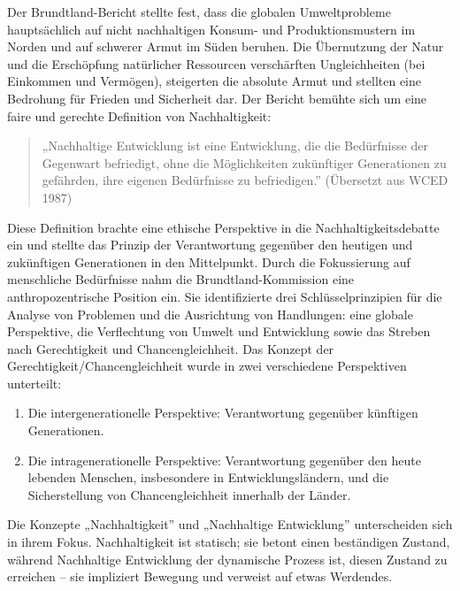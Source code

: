 \documentclass[
  nswissgerman,
  a4paper,
  DIV=11,
  numbers=noendperiod,
  oneside,
  openany]{scrreprt}
\providecommand{\tightlist}{%
  \setlength{\itemsep}{0pt}\setlength{\parskip}{0pt}}
\begin{document}
Der Brundtland-Bericht stellte fest, dass die globalen Umweltprobleme
hauptsächlich auf nicht nachhaltigen Konsum- und Produktionsmustern im
Norden und auf schwerer Armut im Süden beruhen. Die Übernutzung der
Natur und die Erschöpfung natürlicher Ressourcen verschärften
Ungleichheiten (bei Einkommen und Vermögen), steigerten die absolute
Armut und stellten eine Bedrohung für Frieden und Sicherheit dar. Der
Bericht bemühte sich um eine faire und gerechte Definition von
Nachhaltigkeit:

\begin{quote}
„Nachhaltige Entwicklung ist eine Entwicklung, die die Bedürfnisse der
Gegenwart befriedigt, ohne die Möglichkeiten zukünftiger Generationen zu
gefährden, ihre eigenen Bedürfnisse zu befriedigen.'' (Übersetzt aus
WCED 1987)
\end{quote}

Diese Definition brachte eine ethische Perspektive in die
Nachhaltigkeitsdebatte ein und stellte das Prinzip der Verantwortung
gegenüber den heutigen und zukünftigen Generationen in den Mittelpunkt.
Durch die Fokussierung auf menschliche Bedürfnisse nahm die
Brundtland-Kommission eine anthropozentrische Position ein. Sie
identifizierte drei Schlüsselprinzipien für die Analyse von Problemen
und die Ausrichtung von Handlungen: eine globale Perspektive, die
Verflechtung von Umwelt und Entwicklung sowie das Streben nach
Gerechtigkeit und Chancengleichheit. Das Konzept der
Gerechtigkeit/Chancengleichheit wurde in zwei verschiedene Perspektiven
unterteilt:

\begin{enumerate}
\def\labelenumi{\arabic{enumi}.}
\tightlist
\item
  Die intergenerationelle Perspektive: Verantwortung gegenüber künftigen
  Generationen.
\item
  Die intragenerationelle Perspektive: Verantwortung gegenüber den heute
  lebenden Menschen, insbesondere in Entwicklungsländern, und die
  Sicherstellung von Chancengleichheit innerhalb der Länder.
\end{enumerate}

\begin{tcolorbox}[enhanced jigsaw, arc=.35mm, bottomrule=.15mm, bottomtitle=1mm, breakable, colback=white, colbacktitle=quarto-callout-note-color!10!white, colframe=quarto-callout-note-color-frame, coltitle=black, left=2mm, leftrule=.75mm, opacityback=0, opacitybacktitle=0.6, rightrule=.15mm, title={Nachhaltigkeit und Nachhaltige Entwicklung}, titlerule=0mm, toprule=.15mm, toptitle=1mm]

Die Konzepte „Nachhaltigkeit'' und „Nachhaltige Entwicklung''
unterscheiden sich in ihrem Fokus. Nachhaltigkeit ist statisch; sie
betont einen beständigen Zustand, während Nachhaltige Entwicklung der
dynamische Prozess ist, diesen Zustand zu erreichen -- sie impliziert
Bewegung und verweist auf etwas Werdendes.

\end{tcolorbox}
\end{document}
